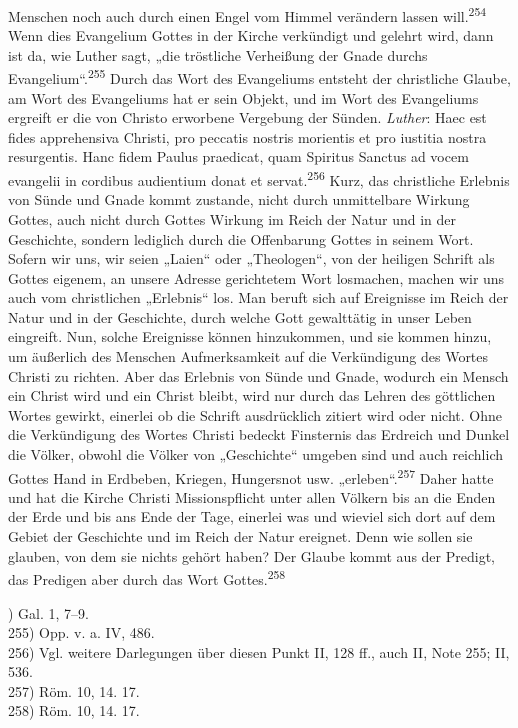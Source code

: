 Menschen noch auch durch einen Engel vom Himmel verändern lassen will.\textsuperscript{254} Wenn dies Evangelium Gottes in der Kirche verkündigt und gelehrt wird, dann ist da, wie Luther sagt, „die tröstliche Verheißung der Gnade durchs Evangelium“.\textsuperscript{255} Durch das Wort des Evangeliums entsteht der christliche Glaube, am Wort des Evangeliums hat er sein Objekt, und im Wort des Evangeliums ergreift er die von Christo erworbene Vergebung der Sünden. \emph{Luther}: Haec est fides apprehensiva Christi, pro peccatis nostris morientis et pro iustitia nostra resurgentis. Hanc fidem Paulus praedicat, quam Spiritus Sanctus ad vocem evangelii in cordibus audientium donat et servat.\textsuperscript{256} Kurz, das christliche Erlebnis von Sünde und Gnade kommt zustande, nicht durch unmittelbare Wirkung Gottes, auch nicht durch Gottes Wirkung im Reich der Natur und in der Geschichte, sondern lediglich durch die Offenbarung Gottes in seinem Wort. Sofern wir uns, wir seien „Laien“ oder „Theologen“, von der heiligen Schrift als Gottes eigenem, an unsere Adresse gerichtetem Wort losmachen, machen wir uns auch vom christlichen „Erlebnis“ los. Man beruft sich auf Ereignisse im Reich der Natur und in der Geschichte, durch welche Gott gewalttätig in unser Leben eingreift. Nun, solche Ereignisse können hinzukommen, und sie kommen hinzu, um äußerlich des Menschen Aufmerksamkeit auf die Verkündigung des Wortes Christi zu richten. Aber das Erlebnis von Sünde und Gnade, wodurch ein Mensch ein Christ wird und ein Christ bleibt, wird nur durch das Lehren des göttlichen Wortes gewirkt, einerlei ob die Schrift ausdrücklich zitiert wird oder nicht. Ohne die Verkündigung des Wortes Christi bedeckt Finsternis das Erdreich und Dunkel die Völker, obwohl die Völker von „Geschichte“ umgeben sind und auch reichlich Gottes Hand in Erdbeben, Kriegen, Hungersnot usw. „erleben“.\textsuperscript{257} Daher hatte und hat die Kirche Christi Missionspflicht unter allen Völkern bis an die Enden der Erde und bis ans Ende der Tage, einerlei was und wieviel sich dort auf dem Gebiet der Geschichte und im Reich der Natur ereignet. Denn wie sollen sie glauben, von dem sie nichts gehört haben? Der Glaube kommt aus der Predigt, das Predigen aber durch das Wort Gottes.\textsuperscript{258}\par\vspace{1em}\par\begin{footnotesize}) Gal. 1, 7--9.\\255) Opp. v. a. IV, 486.\\256) Vgl. weitere Darlegungen über diesen Punkt II, 128 ff., auch II, Note 255; II, 536.\\257) Röm. 10, 14. 17.\\258) Röm. 10, 14. 17.\end{footnotesize}
